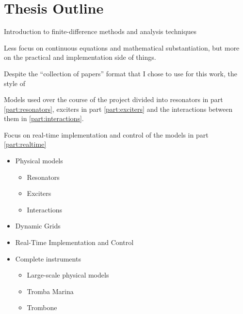 
\section{Thesis Outline}

Introduction to finite-difference methods and analysis techniques

Less focus on continuous equations and mathematical substantiation, but more on the practical and implementation side of things.

Despite the ``collection of papers'' format that I chose to use for this work, the style of  




Models used over the course of the project divided into resonators in part \ref{part:resonators}, exciters in part \ref{part:exciters} and the interactions between them in \ref{part:interactions}.

Focus on real-time implementation and control of the models in part \ref{part:realtime}
\begin{itemize}
    \item Physical models
    \begin{itemize}
        \item Resonators
        \item Exciters
        \item Interactions
    \end{itemize}
    \item Dynamic Grids
    \item Real-Time Implementation and Control
    \item Complete instruments
    \begin{itemize}
        \item Large-scale physical models
        \item Tromba Marina
        \item Trombone
    \end{itemize}
\end{itemize}